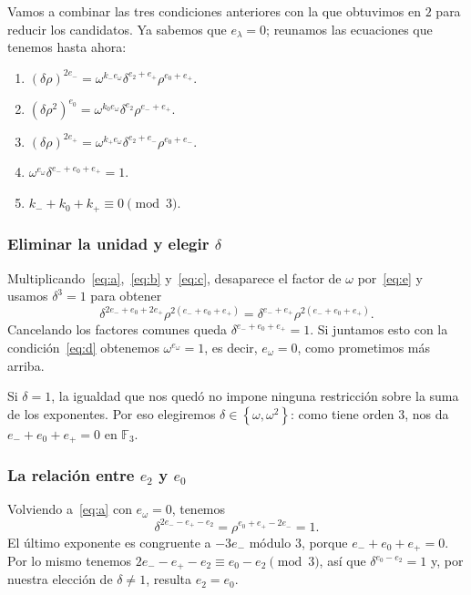 \documentclass[a4paper]{book}
\theoremstyle{definition}
\theoremstyle{plain}
\newcommand{\FF}{\mathbb{F}}
\newcommand{\lla}{\left\lbrace}
\newcommand{\rla}{\right\rbrace}
\begin{document}
Vamos a combinar las tres condiciones anteriores con la que obtuvimos en $2$ para reducir los candidatos. Ya sabemos que $e_\lambda=0$; reunamos las ecuaciones que tenemos hasta ahora:
\begin{enumerate}[label=(\alph*),ref=\alph*] %
    \item\label{eq:a} ${(\delta\rho)}^{2e_-}=\omega^{k_-e_\omega}\delta^{e_2+e_+}\rho^{e_0+e_+}$.
    \item\label{eq:b} ${(\delta\rho^2)}^{e_0}=\omega^{k_0e_\omega}\delta^{e_2}\rho^{e_-+e_+}$.
    \item\label{eq:c} ${(\delta\rho)}^{2e_+}=\omega^{k_+e_\omega}\delta^{e_2+e_-}\rho^{e_0+e_-}$.
    \item\label{eq:d} $\omega^{e_\omega}\delta^{e_-+e_0+e_+}=1$.
    \item\label{eq:e} $k_-+k_0+k_+\equiv0\pmod3$.
\end{enumerate}

\subsubsection*{Eliminar la unidad y elegir \texorpdfstring{$\delta$}{delta}}

Multiplicando~\eqref{eq:a},~\eqref{eq:b} y~\eqref{eq:c}, desaparece el factor de $\omega$ por~\eqref{eq:e} y usamos $\delta^3=1$ para obtener
\[
\delta^{2e_-+e_0+2e_+}\rho^{2(e_-+e_0+e_+)}
=\delta^{e_-+e_+}\rho^{2(e_-+e_0+e_+)}.
\]
Cancelando los factores comunes queda $\delta^{e_-+e_0+e_+}=1$. Si juntamos esto con la condición~\eqref{eq:d} obtenemos $\omega^{e_\omega}=1$, es decir, $e_\omega=0$, como prometimos más arriba.

Si $\delta=1$, la igualdad que nos quedó no impone ninguna restricción sobre la suma de los exponentes. Por eso elegiremos $\delta\in\lla\omega,\omega^2\rla$: como tiene orden $3$, nos da $e_-+e_0+e_+=0$ en $\FF_3$.

\subsubsection*{La relación entre \texorpdfstring{$e_2$}{e2} y \texorpdfstring{$e_0$}{e0}}

Volviendo a~\eqref{eq:a} con $e_\omega=0$, tenemos
\[
\delta^{2e_--e_+-e_2}
=\rho^{e_0+e_+-2e_-}=1.
\]
El último exponente es congruente a $-3e_-$ módulo $3$, porque $e_-+e_0+e_+=0$. Por lo mismo tenemos $2e_--e_+-e_2 \equiv e_0-e_2 \pmod 3$, así que $\delta^{e_0-e_2}=1$ y, por nuestra elección de $\delta\neq 1$, resulta $e_2=e_0$.
\end{document}
